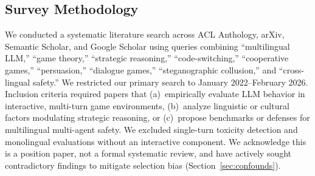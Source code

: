 \documentclass[11pt]{article}
\begin{document}
\subsection{Survey Methodology}
\label{sec:methodology}

We conducted a systematic literature search across ACL Anthology, arXiv, Semantic Scholar, and Google Scholar using queries combining ``multilingual LLM,'' ``game theory,'' ``strategic reasoning,'' ``code-switching,'' ``cooperative games,'' ``persuasion,'' ``dialogue games,'' ``steganographic collusion,'' and ``cross-lingual safety.'' We restricted our primary search to January 2022--February 2026. Inclusion criteria required papers that (a)~empirically evaluate LLM behavior in interactive, multi-turn game environments, (b)~analyze linguistic or cultural factors modulating strategic reasoning, or (c)~propose benchmarks or defenses for multilingual multi-agent safety. We excluded single-turn toxicity detection and monolingual evaluations without an interactive component. We acknowledge this is a position paper, not a formal systematic review, and have actively sought contradictory findings to mitigate selection bias (Section~\ref{sec:confounds}).

\end{document}

